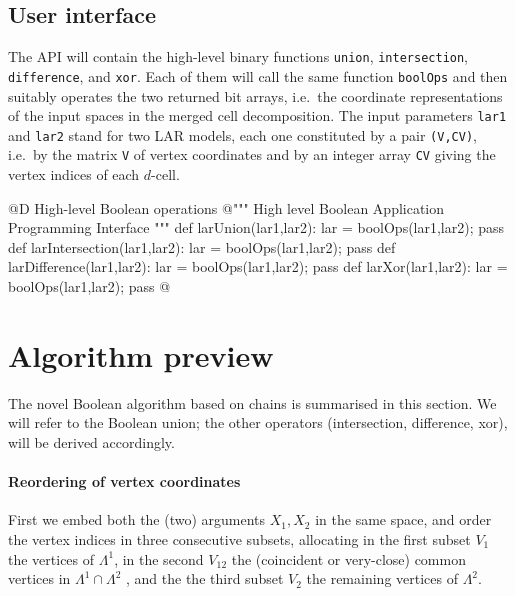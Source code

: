 \documentclass[11pt,oneside]{article}	%
\begin{document}
\subsection{User interface}

The API will contain the high-level binary functions \texttt{union}, \texttt{intersection}, \texttt{difference}, and \texttt{xor}. Each of them will call the same function \texttt{boolOps} and then suitably operates the two returned bit arrays, i.e.~the coordinate representations of the input spaces in the merged cell decomposition. The input parameters \texttt{lar1} and  \texttt{lar2} stand for two LAR models, each one constituted by a pair \texttt{(V,CV)}, i.e.~by the matrix \texttt{V} of vertex coordinates and by an integer array \texttt{CV} giving the vertex indices of each $d$-cell.

@D High-level Boolean operations
@{""" High level Boolean Application Programming Interface """
def larUnion(lar1,lar2): lar = boolOps(lar1,lar2); pass
def larIntersection(lar1,lar2): lar = boolOps(lar1,lar2); pass
def larDifference(lar1,lar2): lar = boolOps(lar1,lar2); pass
def larXor(lar1,lar2): lar = boolOps(lar1,lar2); pass
@}


\section{Algorithm preview}

The novel Boolean algorithm based on chains is summarised in this section. We will refer to the Boolean union; the other operators (intersection, difference, xor), will be derived accordingly.

\paragraph{Reordering of vertex coordinates}
First we embed both the (two) arguments $X_1, X_2$ in the same space, and order the vertex indices in three consecutive subsets, allocating in the first subset $V_1$ the vertices of $\Lambda^1$, in the second $V_{12}$ the (coincident or very-close) common vertices in $\Lambda^1\cap\Lambda^2$ , and the the third subset $V_2$ the remaining vertices of $\Lambda^2$. 
\end{document}
